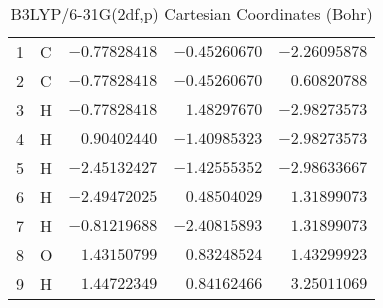 \documentclass[10pt,oneside]{article}
\begin{document}
\begin{table}[h]
\centering
\caption{B3LYP/6-31G(2df,p) Cartesian Coordinates (Bohr)}
\begin{tabular}{llrrr}
\toprule
1  & C  & $-0.77828418$ & $-0.45260670$ & $-2.26095878$ \\
2  & C  & $-0.77828418$ & $-0.45260670$ & $ 0.60820788$ \\
3  & H  & $-0.77828418$ & $ 1.48297670$ & $-2.98273573$ \\
4  & H  & $ 0.90402440$ & $-1.40985323$ & $-2.98273573$ \\
5  & H  & $-2.45132427$ & $-1.42555352$ & $-2.98633667$ \\
6  & H  & $-2.49472025$ & $ 0.48504029$ & $ 1.31899073$ \\
7  & H  & $-0.81219688$ & $-2.40815893$ & $ 1.31899073$ \\
8  & O  & $ 1.43150799$ & $ 0.83248524$ & $ 1.43299923$ \\
9  & H  & $ 1.44722349$ & $ 0.84162466$ & $ 3.25011069$ \\
\bottomrule
\end{tabular}
\end{table}
\end{document}

